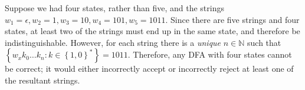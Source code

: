 \documentclass{article}
\begin{document}
\begin{enumerate}
    Suppose we had four states, rather than five, and the strings $w_1 = \epsilon, w_2 = 1, w_3 = 10, w_4 = 101, w_5 = 1011$. Since there are five strings and four states, at least two of the strings must end up in the same state, and therefore be indistinguishable. However, for each string there is a \textit{unique} $n \in \mathbb{N}$ such that $\left\{w_xk_0\ldots k_n : k \in \left\{1, 0\right\}^*\right\} = 1011$. Therefore, any DFA with four states cannot be correct; it would either incorrectly accept or incorrectly reject at least one of the resultant strings.

\end{enumerate}
\end{document}
